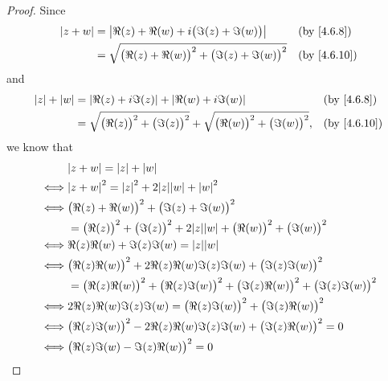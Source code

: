 \begin{proof}
  Since
  \begin{align*}
    \abs{z + w} & = \abs{\Re(z) + \Re(w) + i \big(\Im(z) + \Im(w)\big)}              &  & \text{(by \cref{4.6.8})}  \\
                & = \sqrt{\big(\Re(z) + \Re(w)\big)^2 + \big(\Im(z) + \Im(w)\big)^2} &  & \text{(by \cref{4.6.10})}
  \end{align*}
  and
  \begin{align*}
    \abs{z} + \abs{w} & = \abs{\Re(z) + i \Im(z)} + \abs{\Re(w) + i \Im(w)}                                                &  & \text{(by \cref{4.6.8})}  \\
                      & = \sqrt{\big(\Re(z)\big)^2 + \big(\Im(z)\big)^2} + \sqrt{\big(\Re(w)\big)^2 + \big(\Im(w)\big)^2}, &  & \text{(by \cref{4.6.10})}
  \end{align*}
  we know that
  \begin{align*}
         & \abs{z + w} = \abs{z} + \abs{w}                                                                                 \\
    \iff & \abs{z + w}^2 = \abs{z}^2 + 2 \abs{z} \abs{w} + \abs{w}^2                                                       \\
    \iff & \big(\Re(z) + \Re(w)\big)^2 + \big(\Im(z) + \Im(w)\big)^2                                                       \\
         & = \big(\Re(z)\big)^2 + \big(\Im(z)\big)^2 + 2 \abs{z} \abs{w} + \big(\Re(w)\big)^2 + \big(\Im(w)\big)^2         \\
    \iff & \Re(z) \Re(w) + \Im(z) \Im(w) = \abs{z} \abs{w}                                                                 \\
    \iff & \big(\Re(z) \Re(w)\big)^2 + 2 \Re(z) \Re(w) \Im(z) \Im(w) + \big(\Im(z) \Im(w)\big)^2                           \\
         & = \big(\Re(z) \Re(w)\big)^2 + \big(\Re(z) \Im(w)\big)^2 + \big(\Im(z) \Re(w)\big)^2 + \big(\Im(z) \Im(w)\big)^2 \\
    \iff & 2 \Re(z) \Re(w) \Im(z) \Im(w) = \big(\Re(z) \Im(w)\big)^2 + \big(\Im(z) \Re(w)\big)^2                           \\
    \iff & \big(\Re(z) \Im(w)\big)^2 - 2 \Re(z) \Re(w) \Im(z) \Im(w) + \big(\Im(z) \Re(w)\big)^2 = 0                       \\
    \iff & \big(\Re(z) \Im(w) - \Im(z) \Re(w)\big)^2 = 0                                                                   \\

\end{align*}
\end{proof}
